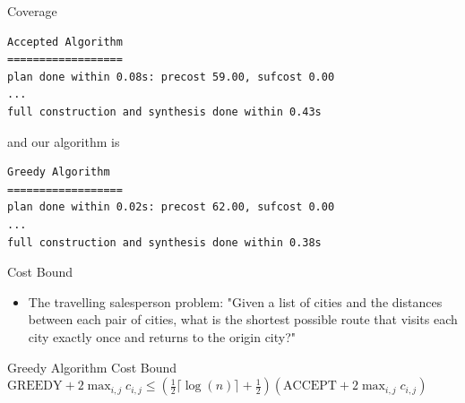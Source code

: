 \documentclass{beamer}
\begin{document}
\begin{frame}[fragile]{Coverage}
\begingroup
\fontsize{9pt}{12pt}\selectfont
\begin{lstlisting}
Accepted Algorithm
==================
plan done within 0.08s: precost 59.00, sufcost 0.00
...
full construction and synthesis done within 0.43s 
\end{lstlisting}
\endgroup
and our algorithm is 

\begingroup
\fontsize{9pt}{12pt}\selectfont
\begin{lstlisting}
Greedy Algorithm
==================
plan done within 0.02s: precost 62.00, sufcost 0.00
...
full construction and synthesis done within 0.38s 
\end{lstlisting}
\endgroup
\end{frame}

\begin{frame}{Cost Bound}
\begin{itemize}
\item The travelling salesperson problem: "Given a list of cities and the distances between each pair of cities, what is the shortest possible route that visits each city exactly once and returns to the origin city?"
\end{itemize}
\pause 

\begin{alertblock}{Greedy Algorithm Cost Bound}
$\text{GREEDY} + 2\max_{i,j} c_{i,j} \leq (\frac{1}{2} \lceil \log(n) \rceil + \frac{1}{2}) (\text{ACCEPT} + 2 \max_{i,j} c_{i,j})$
\end{alertblock}
\end{frame}
\end{document}

